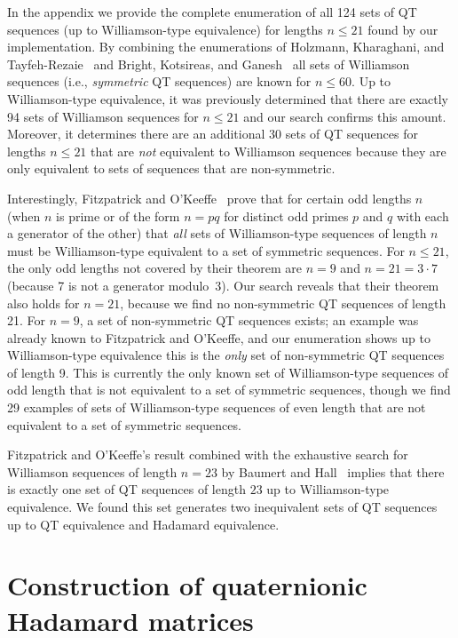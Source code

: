 \documentclass[12pt]{article}
\numberwithin{equation}{section}
\begin{document}
In the appendix we provide the complete enumeration of all 124 sets of
QT sequences (up to Williamson-type equivalence) for lengths $n\leq21$
found by our implementation.
By combining the enumerations of
Holzmann, Kharaghani, and Tayfeh-Rezaie~\cite{Holzmann2008}
and Bright, Kotsireas, and Ganesh~\cite{BKG20-perfect-sequences}
all sets of Williamson sequences (i.e.,
\emph{symmetric} QT sequences)
are known for $n\leq60$.
Up to Williamson-type equivalence, it was previously
determined that there are exactly
94 sets of Williamson sequences for $n\leq21$ and our search
confirms this amount. Moreover, it determines
there are an additional 30 sets of QT sequences for lengths $n\leq21$
that are \emph{not} equivalent to Williamson sequences because they
are only equivalent to sets of sequences that are non-symmetric.

Interestingly, Fitzpatrick
and O'Keeffe~\cite{Fitzpatrick2023} prove that for certain odd
lengths $n$ (when $n$ is prime or of the form
$n=pq$ for distinct odd primes $p$ and $q$ with each
a generator of the other) that \emph{all} sets of Williamson-type
sequences of length $n$ must be Williamson-type equivalent to a set of symmetric sequences.
For $n\leq21$, the only odd lengths not covered by their theorem
are $n=9$ and $n=21=3\cdot7$ (because 7 is not a generator modulo~3).
Our search reveals that their theorem also holds for $n=21$, because
we find no non-symmetric QT sequences of length 21.
For $n=9$, a set of non-symmetric QT sequences exists;
an example was already known to Fitzpatrick
and O'Keeffe, and our enumeration shows up to Williamson-type equivalence this is the \emph{only}
set of non-symmetric QT sequences of length 9.
This is currently the only known set of Williamson-type sequences
of odd length that is not equivalent to a set of symmetric sequences,
though we find 29 examples of sets of
Williamson-type sequences of even length that are not equivalent to a
set of symmetric sequences.

Fitzpatrick and O'Keeffe's result combined with the
exhaustive search for Williamson sequences of length $n=23$
by Baumert and Hall~\cite{Baumert1965}
implies that there is exactly one set of QT sequences of length $23$
up to Williamson-type equivalence.
We found this set generates two inequivalent sets of QT sequences
up to QT equivalence and Hadamard equivalence.

\section{Construction of quaternionic Hadamard matrices}
\label{sec:qhm}
\end{document}
